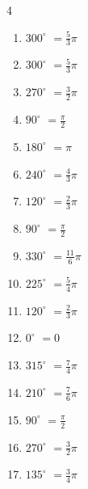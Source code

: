 \begin{multicols}{4}
\begin{enumerate}
  \item $\displaystyle 300^{\circ}$
        $\displaystyle =\frac{5}{3}\pi$

  \item $\displaystyle 300^{\circ}$
        $\displaystyle =\frac{5}{3}\pi$

\columnbreak %

  \item $\displaystyle 270^{\circ}$
        $\displaystyle =\frac{3}{2}\pi$

  \item $\displaystyle 90^{\circ}$
        $\displaystyle =\frac{\pi}{2}$

  \item $\displaystyle 180^{\circ}$
        $\displaystyle =\pi$

  \item $\displaystyle 240^{\circ}$
        $\displaystyle =\frac{4}{3}\pi$

  \item $\displaystyle 120^{\circ}$
        $\displaystyle =\frac{2}{3}\pi$

  \item $\displaystyle 90^{\circ}$
        $\displaystyle =\frac{\pi}{2}$

  \item $\displaystyle 330^{\circ}$
        $\displaystyle =\frac{11}{6}\pi$

  \item $\displaystyle 225^{\circ}$
        $\displaystyle =\frac{5}{4}\pi$

  \item $\displaystyle 120^{\circ}$
        $\displaystyle =\frac{2}{3}\pi$

  \item $\displaystyle 0^{\circ}$
        $\displaystyle =0$

  \item $\displaystyle 315^{\circ}$
        $\displaystyle =\frac{7}{4}\pi$

  \item $\displaystyle 210^{\circ}$
        $\displaystyle =\frac{7}{6}\pi$

  \item $\displaystyle 90^{\circ}$
        $\displaystyle =\frac{\pi}{2}$

  \item $\displaystyle 270^{\circ}$
        $\displaystyle =\frac{3}{2}\pi$

  \item $\displaystyle 135^{\circ}$
        $\displaystyle =\frac{3}{4}\pi$


\end{enumerate}
\end{multicols}

